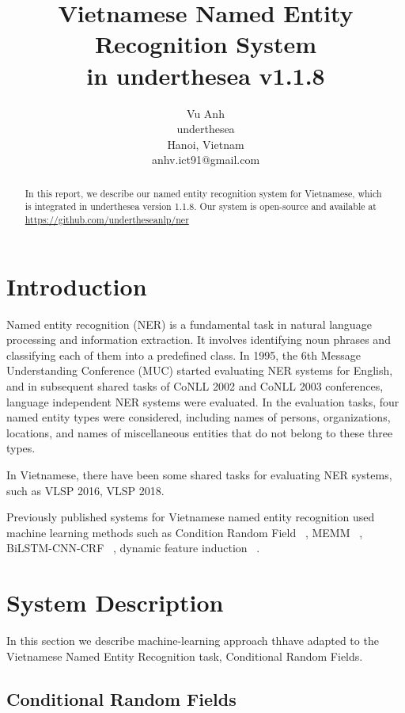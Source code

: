 \documentclass[11pt,a4paper]{article}
\title{Vietnamese Named Entity Recognition System \\ in underthesea v1.1.8}
\author{
Vu Anh\\
underthesea\\
Hanoi, Vietnam\\
anhv.ict91@gmail.com
}
\date{}
\begin{document}
\maketitle
\begin{abstract}
In this report, we describe our named entity recognition system for Vietnamese, which is integrated in underthesea version 1.1.8.
Our system is open-source and available at \url{https://github.com/undertheseanlp/ner}

\end{abstract}

\section{Introduction}

Named entity recognition (NER) is a fundamental task in natural language processing and information extraction.
It involves identifying noun phrases and classifying each of them into a predefined class.
In 1995, the 6th Message Understanding Conference (MUC) started evaluating NER systems for English, and in subsequent shared tasks of CoNLL 2002 and CoNLL 2003 conferences, language independent NER systems were evaluated.
In the evaluation tasks, four named entity types were considered, including names of persons, organizations, locations, and names of miscellaneous entities that do not belong to these three types.

In Vietnamese, there have been some shared tasks for evaluating NER systems, such as VLSP 2016, VLSP 2018.

Previously published systems for Vietnamese named entity recognition used machine learning methods such as Condition Random Field ~\cite{DBLP:journals/corr/abs-1803-08463}, MEMM ~\cite{DBLP:journals/corr/Le-Hong16}, BiLSTM-CNN-CRF ~\cite{DBLP:journals/corr/abs-1708-07241}, dynamic feature induction ~\cite{DBLP:journals/corr/abs-1801-01331}.

\section{System Description}

In this section we describe machine-learning approach thhave adapted to the Vietnamese Named Entity Recognition task, Conditional Random Fields.

\subsection{Conditional Random Fields}
\end{document}

